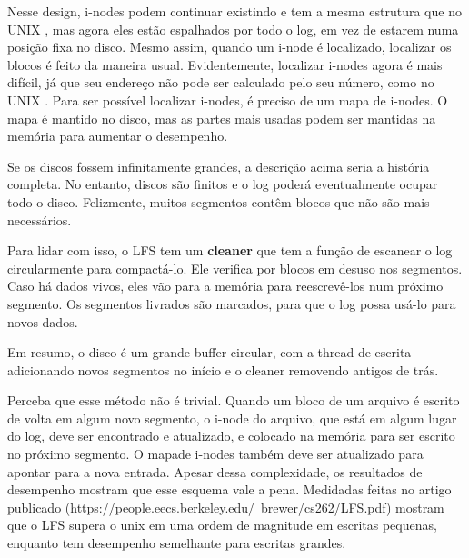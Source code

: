 \documentclass{article}
\newcommand\unix{{\color{red}UNIX} }
\begin{document}
Nesse design, i-nodes podem continuar existindo e tem a mesma estrutura que no \unix, mas agora eles estão espalhados por todo o log, em vez de estarem numa posição fixa no disco. Mesmo assim, quando um i-node é localizado, localizar os blocos é feito da maneira usual. Evidentemente, localizar i-nodes agora é mais difícil, já que seu endereço não pode ser calculado pelo seu número, como no \unix. Para ser possível localizar i-nodes, é preciso de um mapa de i-nodes. O mapa é mantido no disco, mas as partes mais usadas podem ser mantidas na memória para aumentar o desempenho.

Se os discos fossem infinitamente grandes, a descrição acima seria a história completa. No entanto, discos são finitos e o log poderá eventualmente ocupar todo o disco. Felizmente, muitos segmentos contêm blocos que não são mais necessários.

Para lidar com isso, o LFS tem um \textbf{cleaner} que tem a função de escanear o log circularmente para compactá-lo. Ele verifica por blocos em desuso nos segmentos. Caso há dados vivos, eles vão para a memória para reescrevê-los num próximo segmento. Os segmentos livrados são marcados, para que o log possa usá-lo para novos dados.

Em resumo, o disco é um grande buffer circular, com a thread de escrita adicionando novos segmentos no início e o cleaner removendo antigos de trás.

Perceba que esse método não é trivial. Quando um bloco de um arquivo é escrito de volta em algum novo segmento, o i-node do arquivo, que está em algum lugar do log, deve ser encontrado e atualizado, e colocado na memória para ser escrito no próximo segmento. O mapade i-nodes também deve ser atualizado para apontar para a nova entrada. Apesar dessa complexidade, os resultados de desempenho mostram que esse esquema vale a pena. Medidadas feitas no artigo publicado (https://people.eecs.berkeley.edu/~brewer/cs262/LFS.pdf) mostram que o LFS supera o unix em uma ordem de magnitude em escritas pequenas, enquanto tem desempenho semelhante para escritas grandes.
\end{document}
